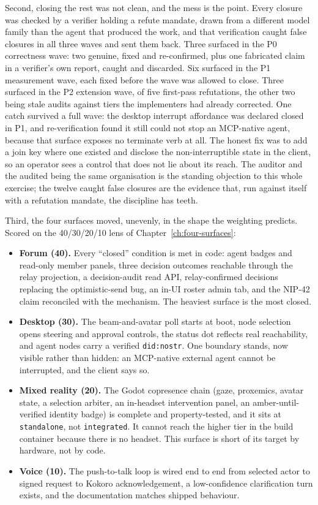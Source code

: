 Second, closing the rest was not clean, and the mess is the point. Every closure was checked by a verifier holding a refute mandate, drawn from a different model family than the agent that produced the work, and that verification caught false closures in all three waves and sent them back. Three surfaced in the P0 correctness wave: two genuine, fixed and re-confirmed, plus one fabricated claim in a verifier's own report, caught and discarded. Six surfaced in the P1 measurement wave, each fixed before the wave was allowed to close. Three surfaced in the P2 extension wave, of five first-pass refutations, the other two being stale audits against tiers the implementers had already corrected. One catch survived a full wave: the desktop interrupt affordance was declared closed in P1, and re-verification found it still could not stop an MCP-native agent, because that surface exposes no terminate verb at all. The honest fix was to add a join key where one existed and disclose the non-interruptible state in the client, so an operator sees a control that does not lie about its reach. The auditor and the audited being the same organisation is the standing objection to this whole exercise; the twelve caught false closures are the evidence that, run against itself with a refutation mandate, the discipline has teeth.

Third, the four surfaces moved, unevenly, in the shape the weighting predicts. Scored on the 40/30/20/10 lens of Chapter~\ref{ch:four-surfaces}:

\begin{itemize}
  \item \textbf{Forum (40).} Every ``closed'' condition is met in code: agent badges and read-only member panels, three decision outcomes reachable through the relay projection, a decision-audit read API, relay-confirmed decisions replacing the optimistic-send bug, an in-UI roster admin tab, and the NIP-42 claim reconciled with the mechanism. The heaviest surface is the most closed.
  \item \textbf{Desktop (30).} The beam-and-avatar poll starts at boot, node selection opens steering and approval controls, the status dot reflects real reachability, and agent nodes carry a verified \texttt{did:nostr}. One boundary stands, now visible rather than hidden: an MCP-native external agent cannot be interrupted, and the client says so.
  \item \textbf{Mixed reality (20).} The Godot copresence chain (gaze, proxemics, avatar state, a selection arbiter, an in-headset intervention panel, an amber-until-verified identity badge) is complete and property-tested, and it sits at \texttt{standalone}, not \texttt{integrated}. It cannot reach the higher tier in the build container because there is no headset. This surface is short of its target by hardware, not by code.
  \item \textbf{Voice (10).} The push-to-talk loop is wired end to end from selected actor to signed request to Kokoro acknowledgement, a low-confidence clarification turn exists, and the documentation matches shipped behaviour.
\end{itemize}

